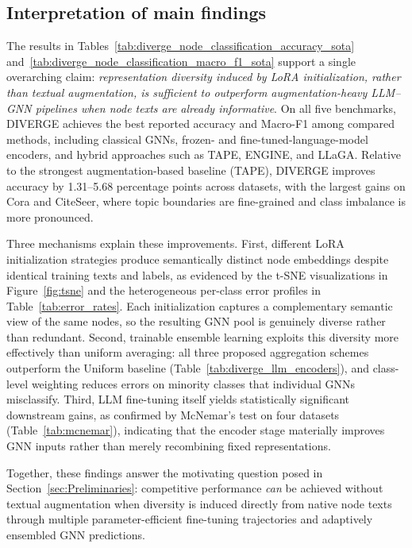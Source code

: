 \documentclass[a4paper,fleqn]{cas-sc}
\begin{document}
\subsection{Interpretation of main findings}\label{sec:resultsAnalysis}

The results in Tables~\ref{tab:diverge_node_classification_accuracy_sota} and~\ref{tab:diverge_node_classification_macro_f1_sota} support a single overarching claim: \emph{representation diversity induced by LoRA initialization, rather than textual augmentation, is sufficient to outperform augmentation-heavy LLM--GNN pipelines when node texts are already informative}. On all five benchmarks, DIVERGE achieves the best reported accuracy and Macro-F1 among compared methods, including classical GNNs, frozen- and fine-tuned-language-model encoders, and hybrid approaches such as TAPE, ENGINE, and LLaGA. Relative to the strongest augmentation-based baseline (TAPE), DIVERGE improves accuracy by 1.31--5.68 percentage points across datasets, with the largest gains on Cora and CiteSeer, where topic boundaries are fine-grained and class imbalance is more pronounced.

Three mechanisms explain these improvements. First, different LoRA initialization strategies produce semantically distinct node embeddings despite identical training texts and labels, as evidenced by the t-SNE visualizations in Figure~\ref{fig:tsne} and the heterogeneous per-class error profiles in Table~\ref{tab:error_rates}. Each initialization captures a complementary semantic view of the same nodes, so the resulting GNN pool is genuinely diverse rather than redundant. Second, trainable ensemble learning exploits this diversity more effectively than uniform averaging: all three proposed aggregation schemes outperform the Uniform baseline (Table~\ref{tab:diverge_llm_encoders}), and class-level weighting reduces errors on minority classes that individual GNNs misclassify. Third, LLM fine-tuning itself yields statistically significant downstream gains, as confirmed by McNemar's test on four datasets (Table~\ref{tab:mcnemar}), indicating that the encoder stage materially improves GNN inputs rather than merely recombining fixed representations.

Together, these findings answer the motivating question posed in Section~\ref{sec:Preliminaries}: competitive performance \emph{can} be achieved without textual augmentation when diversity is induced directly from native node texts through multiple parameter-efficient fine-tuning trajectories and adaptively ensembled GNN predictions.
\end{document}
